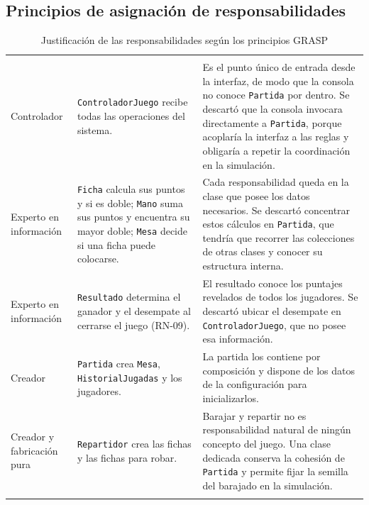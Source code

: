 \clearpage
\subsection{Principios de asignación de responsabilidades}

{\tablacompacta
\begin{longtable}{@{}L{2.7cm}L{4.3cm}L{7.5cm}@{}}
  \caption{Justificación de las responsabilidades según los principios GRASP}\label{tab:grasp}\\
  \toprule
   &  &  \\ \midrule \endfirsthead
  \toprule
   &  &  \\ \midrule \endhead
  \bottomrule \endlastfoot
  Controlador & \texttt{ControladorJuego} recibe todas las operaciones del sistema. & Es el punto único de entrada desde la interfaz, de modo que la consola no conoce \texttt{Partida} por dentro. Se descartó que la consola invocara directamente a \texttt{Partida}, porque acoplaría la interfaz a las reglas y obligaría a repetir la coordinación en la simulación. \\ \filasep
  Experto en información & \texttt{Ficha} calcula sus puntos y si es doble; \texttt{Mano} suma sus puntos y encuentra su mayor doble; \texttt{Mesa} decide si una ficha puede colocarse. & Cada responsabilidad queda en la clase que posee los datos necesarios. Se descartó concentrar estos cálculos en \texttt{Partida}, que tendría que recorrer las colecciones de otras clases y conocer su estructura interna. \\ \filasep
  Experto en información & \texttt{Resultado} determina el ganador y el desempate al cerrarse el juego (RN-09). & El resultado conoce los puntajes revelados de todos los jugadores. Se descartó ubicar el desempate en \texttt{ControladorJuego}, que no posee esa información. \\ \filasep
  Creador & \texttt{Partida} crea \texttt{Mesa}, \texttt{HistorialJugadas} y los jugadores. & La partida los contiene por composición y dispone de los datos de la configuración para inicializarlos. \\ \filasep
  Creador y fabricación pura & \texttt{Repartidor} crea las fichas y las fichas para robar. & Barajar y repartir no es responsabilidad natural de ningún concepto del juego. Una clase dedicada conserva la cohesión de \texttt{Partida} y permite fijar la semilla del barajado en la simulación. \\ \filasep

\end{longtable}}

